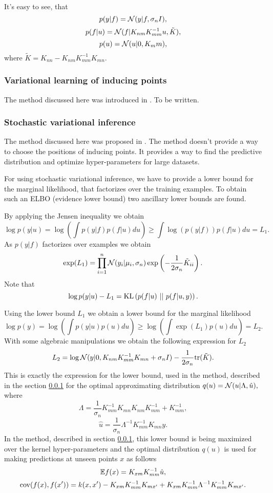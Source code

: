 \documentclass[12pt]{article}
\begin{document}
	It's easy to see, that
	$$p(y | f) = \mathcal{N} (y | f, \sigma_n I),$$
	$$p(f | u) = \mathcal{N} (f | K_{nm} K_{mm}^{-1}u, \tilde K),$$
	$$p(u) = \mathcal{N}(u | 0, K_mm),$$
	where $\tilde K = K_{nn} - K_{nm} K_{mm}^{-1} K_{mn}.$
		
	\subsubsection{Variational learning of inducing points}
	\label{Titsias}
	
	\hspace{0.6cm}The method discussed here was introduced in \cite{Titsias}. To be written.
	
	\subsubsection{Stochastic variational inference}
	
	\hspace{0.6cm}The method discussed here was proposed in \cite{BigData}. The method doesn't provide a way to choose the positions of inducing points. It provides a way to find the predictive distribution and optimize hyper-parameters for large datasets.
	
	For using stochastic variational inference, we have to provide a lower bound for the marginal likelihood, that factorizes over the training examples. To obtain such an ELBO (evidence lower bound) two ancillary lower bounds are found. 
	
	By applying the Jensen inequality we obtain
	$$ \log p(y | u) = \log \left ( \int p(y|f) p(f | u) du\right) \ge  \int \log (p(y|f)) p(f | u) du = L_1.$$	
	As $p(y | f)$ factorizes over examples we obtain
	$$\exp(L_1) = \prod_{i = 1}^{n} \mathcal{N}(y_i| \mu_i, \sigma_n) \exp \left( -\frac 1 {2\sigma_n} \tilde K_{ii}\right).$$
	Note that 
	$$\log p(y | u) - L_1 = \mbox{KL}\left(p(f | u)\mbox{ || }p(f | u, y)\right).$$
	
	Using the lower bound $L_1$ we obtain a lower bound for the marginal likelihood
	$$\log p(y) = \log \left( \int p(y|u) p(u) du\right) \ge \log \left( \int \exp(L_1) p(u) du\right) = L_2.$$
	With some algebraic manipulations we obtain the following expression for $L_2$
	$$L_2 = \log \mathcal{N}(y| 0, K_{nm} K_{mm}^{-1} K_{mn} + \sigma_n I) - \frac 1 {2 \sigma_n} \mbox{tr} (\tilde K).$$
	This is exactly the expression for the lower bound, used in the method, described in the section \ref{Titsias} for the optimal approximating distribution $q(u) = \mathcal{N}(u | \Lambda, \hat u),$ where
	$$\Lambda = \frac 1 {\sigma_n} K_{mm}^{-1} K_{mn} K_{nm} K_{mm}^{-1} + K_{mm}^{-1},$$
	$$\hat u = \frac 1 {\sigma_n} \Lambda^{-1} K_{mm}^{-1} K_{mn} y.$$
	In the method, described in section \ref{Titsias}, this lower bound is being maximized over the kernel hyper-parameters and the optimal distribution $q(u)$ is used for making predictions at unseen points $x$ as follows
	$$\mathbb{E} f(x) = K_{xm} K_{mm}^{-1} \hat u, $$
	$$\mbox{cov}(f(x), f(x')) = k(x, x') - K_{xm} K_{mm}^{-1} K_{mx'} + K_{xm} K_{mm}^{-1} \Lambda^{-1} K_{mm}^{-1} K_{mx'}.$$
	
\end{document}
